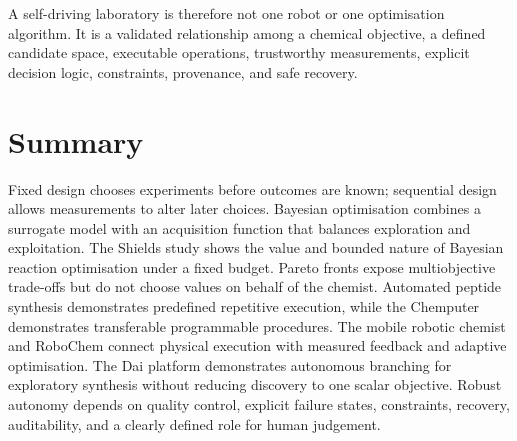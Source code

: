 A self-driving laboratory is therefore not one robot or one optimisation algorithm.
It is a validated relationship among a chemical objective, a defined candidate space, executable operations, trustworthy measurements, explicit decision logic, constraints, provenance, and safe recovery.

\section{Summary}

Fixed design chooses experiments before outcomes are known; sequential design allows measurements to alter later choices.
Bayesian optimisation combines a surrogate model with an acquisition function that balances exploration and exploitation.
The Shields study shows the value and bounded nature of Bayesian reaction optimisation under a fixed budget.
Pareto fronts expose multiobjective trade-offs but do not choose values on behalf of the chemist.
Automated peptide synthesis demonstrates predefined repetitive execution, while the Chemputer demonstrates transferable programmable procedures.
The mobile robotic chemist and RoboChem connect physical execution with measured feedback and adaptive optimisation.
The Dai platform demonstrates autonomous branching for exploratory synthesis without reducing discovery to one scalar objective.
Robust autonomy depends on quality control, explicit failure states, constraints, recovery, auditability, and a clearly defined role for human judgement.

